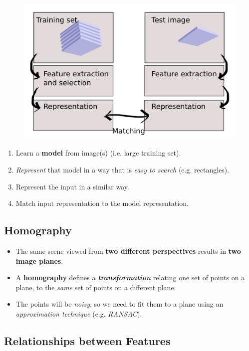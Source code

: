 \documentclass[english, 10pt]{article}
\begin{document}
\begin{figure}[ht!]      
	\centering 
	\includegraphics[scale=0.3]{recognition_framework.png}
\end{figure}

\begin{enumerate}
\item Learn a \textbf{model} from image(s) (i.e. large training set). 
\item \textit{Represent} that model in a way that is \textit{easy to search} (e.g. rectangles). 
\item Represent the input in a similar way. 
\item Match input representation to the model representation.
\end{enumerate}

\subsection{Homography}

\begin{itemize}
\item The same scene viewed from \textbf{two different perspectives} results in \textbf{two image planes}.
\item A \textbf{homography} defines a \textbf{\textit{transformation}} relating one set of points on a plane, to the \textit{same} set of points on a different plane.
\item The points will be \textit{noisy}, so we need to fit them to a plane using an \textit{approximation technique} (e.g. \textit{RANSAC}).
\end{itemize}

\subsection{Relationships between Features}
\end{document}
